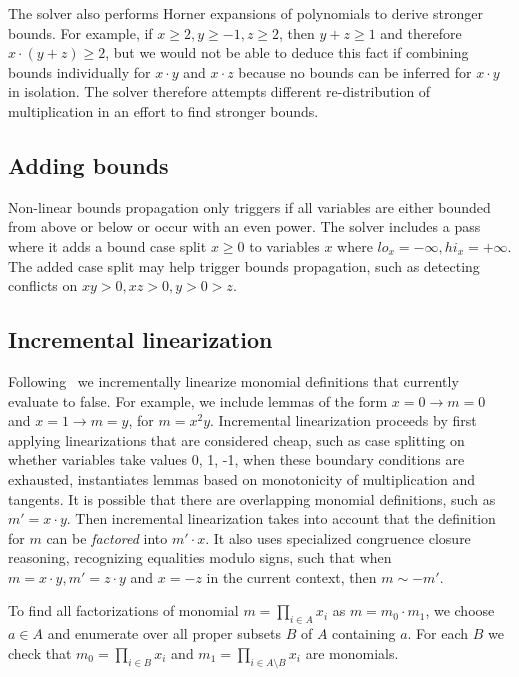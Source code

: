 The solver also performs Horner expansions of polynomials to derive stronger bounds.
For example, if $x \geq 2, y \geq -1, z \geq 2$, then $y + z \geq 1$ 
and therefore $x\cdot (y + z) \geq 2$, but we would not be
able to deduce this fact if combining bounds individually for $x\cdot y$ 
and $x \cdot z$ because no bounds can be inferred for $x \cdot y$ in isolation.
The solver therefore attempts different re-distribution of multiplication
in an effort to find stronger bounds.


\subsection{Adding bounds}
Non-linear bounds propagation only triggers if all variables are either bounded from above or below or occur with an even power.
The solver includes a pass where it adds a bound case split $x \geq 0$ to variables $x$ where $lo_x = -\infty, hi_x = +\infty$.
The added case split may help trigger bounds propagation, such as detecting conflicts on $xy > 0, xz > 0, y > 0 > z$.





\subsection{Incremental linearization}
Following~\cite{CimattiGIRS18} we incrementally linearize monomial definitions that
currently evaluate to false.
For example, we include lemmas of the form $x = 0 \rightarrow m = 0$
and $x = 1 \rightarrow m = y$, for $m = x^2y$.
Incremental linearization proceeds by first applying linearizations that are considered cheap,
such as case splitting on whether variables take values 0, 1, -1, when these boundary conditions
are exhausted, instantiates lemmas based on monotonicity of multiplication and tangents.
It is possible that there are overlapping monomial definitions, such as $m' = x \cdot y$.
Then incremental linearization takes into account that the definition for $m$ can be
\emph{factored} into $m' \cdot x$. It also uses specialized congruence closure reasoning,
recognizing equalities modulo signs, such that when $m = x \cdot y, m' = z \cdot y$ and
$x = -z$ in the current context, then $m \sim -m'$.

To find all factorizations of monomial $m = \prod_{i \in A}{x_i} $ as $m = m_0 \cdot m_1$, we choose $a \in A$ and enumerate over all proper subsets $B$ of $A$ containing $a$. For each $B$ we check that $m_0 = \prod_{i \in B}{x_i}$ and $m_1 = \prod_{i \in A \setminus B}{x_i}$ are monomials.

